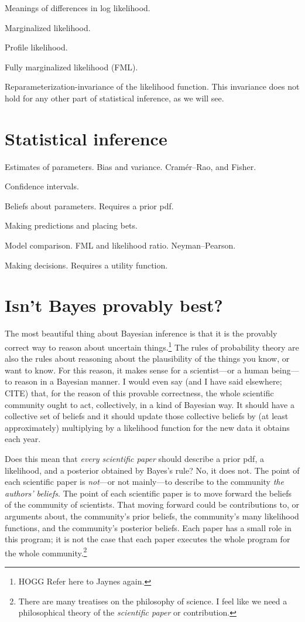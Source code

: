 \documentclass{article}
\begin{document}
Meanings of differences in log likelihood.

Marginalized likelihood.

Profile likelihood.

Fully marginalized likelihood (FML).

Reparameterization-invariance of the likelihood function.
This invariance does not hold for any other part of statistical inference, as we will see.

\section{Statistical inference}
Estimates of parameters. Bias and variance.
Cram\'er--Rao, and Fisher.

Confidence intervals.

Beliefs about parameters. Requires a prior pdf.

Making predictions and placing bets.

Model comparison. FML and likelihood ratio. Neyman--Pearson.

Making decisions. Requires a utility function.

\section{Isn't Bayes provably best?}\label{sec:bayes}
The most beautiful thing about Bayesian inference is that it is the provably correct way to reason about uncertain things.\footnote{%
HOGG Refer here to Jaynes again.}
The rules of probability theory are also the rules about reasoning about the plausibility of the things you know, or want to know.
For this reason, it makes sense for a scientist---or a human being---to reason in a Bayesian manner.
I would even say (and I have said elsewhere; CITE)
that, for the reason of this provable correctness, the whole scientific community ought to act, collectively, in a kind of Bayesian way.
It should have a collective set of beliefs and it should update those collective beliefs by (at least approximately) multiplying by a likelihood function for the new data it obtains each year.

Does this mean that \emph{every scientific paper} should describe a prior pdf, a likelihood, and a posterior obtained by Bayes's rule?
No, it does not.
The point of each scientific paper is \emph{not}---or not mainly---to describe to the community \emph{the authors' beliefs}.
The point of each scientific paper is to move forward the beliefs of the community of scientists.
That moving forward could be contributions to, or arguments about, the community's prior beliefs, the community's many likelihood functions, and the community's posterior beliefs.
Each paper has a small role in this program; it is not the case that each paper executes the whole program for the whole community.\footnote{%
There are many treatises on the philosophy of science.
I feel like we need a philosophical theory of the \emph{scientific paper} or contribution.}
\end{document}

